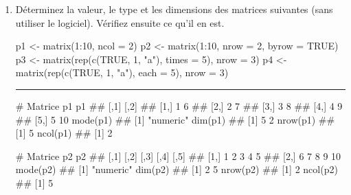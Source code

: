 \documentclass[12pt,twosided, notitlepage]{book}
\newenvironment{Shaded}{}{}
\newcommand{\CommentTok}[1]{\textcolor[rgb]{0.00,0.50,0.00}{#1}}
\newcommand{\DataTypeTok}[1]{#1}
\newcommand{\DecValTok}[1]{#1}
\newcommand{\KeywordTok}[1]{\textcolor[rgb]{0.00,0.00,1.00}{#1}}
\newcommand{\NormalTok}[1]{#1}
\newcommand{\OperatorTok}[1]{#1}
\newcommand{\OtherTok}[1]{\textcolor[rgb]{1.00,0.25,0.00}{#1}}
\newcommand{\StringTok}[1]{\textcolor[rgb]{0.00,0.50,0.50}{#1}}
\newif \ifsol
\renewenvironment{Shaded}{\begin{snugshade}}{\end{snugshade}}
\begin{document}
\begin{enumerate}
\def\labelenumi{\alph{enumi}.}
\item
  Déterminez la valeur, le type et les dimensions des matrices suivantes
  (sans utiliser le logiciel). Vérifiez ensuite ce qu'il en
  est.

\begin{Shaded}
\begin{Highlighting}[]
\NormalTok{p1 <-}\StringTok{ }\KeywordTok{matrix}\NormalTok{(}\DecValTok{1}\OperatorTok{:}\DecValTok{10}\NormalTok{, }\DataTypeTok{ncol =} \DecValTok{2}\NormalTok{)}
\NormalTok{p2 <-}\StringTok{ }\KeywordTok{matrix}\NormalTok{(}\DecValTok{1}\OperatorTok{:}\DecValTok{10}\NormalTok{, }\DataTypeTok{nrow =} \DecValTok{2}\NormalTok{, }\DataTypeTok{byrow =} \OtherTok{TRUE}\NormalTok{)}
\NormalTok{p3 <-}\StringTok{ }\KeywordTok{matrix}\NormalTok{(}\KeywordTok{rep}\NormalTok{(}\KeywordTok{c}\NormalTok{(}\OtherTok{TRUE}\NormalTok{, }\DecValTok{1}\NormalTok{, }\StringTok{"a"}\NormalTok{), }\DataTypeTok{times =} \DecValTok{5}\NormalTok{), }\DataTypeTok{nrow =} \DecValTok{3}\NormalTok{)}
\NormalTok{p4 <-}\StringTok{ }\KeywordTok{matrix}\NormalTok{(}\KeywordTok{rep}\NormalTok{(}\KeywordTok{c}\NormalTok{(}\OtherTok{TRUE}\NormalTok{, }\DecValTok{1}\NormalTok{, }\StringTok{"a"}\NormalTok{), }\DataTypeTok{each =} \DecValTok{5}\NormalTok{), }\DataTypeTok{nrow =} \DecValTok{3}\NormalTok{)}
\end{Highlighting}
\end{Shaded}

  \ifsol 

  \begin{center} \rule{0.5\linewidth}{\linethickness}\end{center}

\begin{Shaded}
\begin{Highlighting}[]
\CommentTok{# Matrice p1}
\NormalTok{p1}
\NormalTok{  ##      [,1] [,2]}
\NormalTok{  ## [1,]    1    6}
\NormalTok{  ## [2,]    2    7}
\NormalTok{  ## [3,]    3    8}
\NormalTok{  ## [4,]    4    9}
\NormalTok{  ## [5,]    5   10}
\KeywordTok{mode}\NormalTok{(p1)}
\NormalTok{  ## [1] "numeric"}
\KeywordTok{dim}\NormalTok{(p1)}
\NormalTok{  ## [1] 5 2}
\KeywordTok{nrow}\NormalTok{(p1)}
\NormalTok{  ## [1] 5}
\KeywordTok{ncol}\NormalTok{(p1)}
\NormalTok{  ## [1] 2}

\CommentTok{# Matrice p2}
\NormalTok{p2}
\NormalTok{  ##      [,1] [,2] [,3] [,4] [,5]}
\NormalTok{  ## [1,]    1    2    3    4    5}
\NormalTok{  ## [2,]    6    7    8    9   10}
\KeywordTok{mode}\NormalTok{(p2)}
\NormalTok{  ## [1] "numeric"}
\KeywordTok{dim}\NormalTok{(p2)}
\NormalTok{  ## [1] 2 5}
\KeywordTok{nrow}\NormalTok{(p2)}
\NormalTok{  ## [1] 2}
\KeywordTok{ncol}\NormalTok{(p2)}
\NormalTok{  ## [1] 5}


\end{Highlighting}
\end{Shaded}
\end{enumerate}
\end{document}
